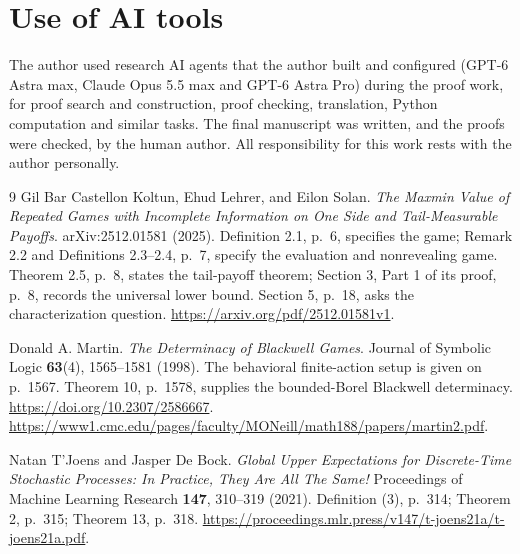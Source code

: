 \documentclass[11pt,a4paper]{article}
\begin{document}
\section*{Use of AI tools}
The author used research AI agents that the author built and configured (GPT-6 Astra max,
Claude Opus 5.5 max and GPT-6 Astra Pro) during the proof work, for proof search and
construction, proof checking, translation, Python computation and similar tasks. The final
manuscript was written, and the proofs were checked, by the human author. All responsibility
for this work rests with the author personally.

\begin{thebibliography}{9}
Gil Bar Castellon Koltun, Ehud Lehrer, and Eilon Solan.
\emph{The Maxmin Value of Repeated Games with Incomplete Information on
One Side and Tail-Measurable Payoffs}. arXiv:2512.01581 (2025).
Definition 2.1, p.~6, specifies the game; Remark 2.2 and Definitions 2.3--2.4,
p.~7, specify the evaluation and nonrevealing game. Theorem 2.5, p.~8,
states the tail-payoff theorem; Section 3, Part 1 of its proof, p.~8, records
the universal lower bound. Section 5, p.~18, asks the characterization question.
\url{https://arxiv.org/pdf/2512.01581v1}.

Donald A. Martin. \emph{The Determinacy of Blackwell Games}.
Journal of Symbolic Logic \textbf{63}(4), 1565--1581 (1998).
The behavioral finite-action setup is given on p.~1567. Theorem 10,
p.~1578, supplies the bounded-Borel Blackwell determinacy.
\url{https://doi.org/10.2307/2586667}.
\url{https://www1.cmc.edu/pages/faculty/MONeill/math188/papers/martin2.pdf}.

Natan T'Joens and Jasper De Bock.
\emph{Global Upper Expectations for Discrete-Time Stochastic Processes:
In Practice, They Are All The Same!}
Proceedings of Machine Learning Research \textbf{147}, 310--319 (2021).
Definition (3), p.~314; Theorem 2, p.~315; Theorem 13, p.~318.
\url{https://proceedings.mlr.press/v147/t-joens21a/t-joens21a.pdf}.
\end{thebibliography}
\end{document}
